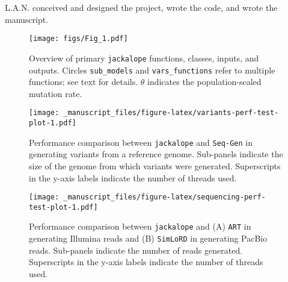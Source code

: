 \documentclass[12pt,]{article}
\begin{document}
L.A.N. conceived and designed the project, wrote the code, and wrote the manuscript.

\begin{figure}
\centering
\texttt{[image: figs/Fig\_1.pdf]}
\caption{\label{fig:jackalope-overview-figure}Overview of primary \texttt{jackalope} functions, classes, inputs, and outputs. Circles \texttt{sub\_models} and \texttt{vars\_functions} refer to multiple functions; see text for details. \(\theta\) indicates the population-scaled mutation rate.}
\end{figure}

\begin{figure}
\centering
\texttt{[image: \_manuscript\_files/figure-latex/variants-perf-test-plot-1.pdf]}
\caption{\label{fig:variants-perf-test-plot}Performance comparison between \texttt{jackalope} and \texttt{Seq-Gen} in generating variants from a reference genome. Sub-panels indicate the size of the genome from which variants were generated. Superscripts in the y-axis labels indicate the number of threads used.}
\end{figure}

\begin{figure}
\centering
\texttt{[image: \_manuscript\_files/figure-latex/sequencing-perf-test-plot-1.pdf]}
\caption{\label{fig:sequencing-perf-test-plot}Performance comparison between \texttt{jackalope} and (A) \texttt{ART} in generating Illumina reads and (B) \texttt{SimLoRD} in generating PacBio reads. Sub-panels indicate the number of reads generated. Superscripts in the y-axis labels indicate the number of threads used.}
\end{figure}
\end{document}
